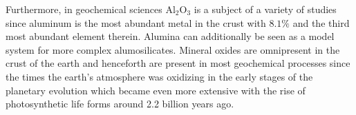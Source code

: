 \documentclass[11pt,DIV=13,BCOR=5mm,a4paper,headinclude]{scrbook}
\begin{document}
Furthermore, in geochemical sciences Al$_2$O$_3$ is a subject of a variety of studies since aluminum is the most abundant metal in the crust with  $8.1\%$ %
and the third most abundant element therein\cite{dtv-Atlas,Riedel}.
Alumina can additionally be seen as a model system for more complex alumosilicates.
Mineral oxides are omnipresent in the crust of the earth and henceforth are present in most geochemical processes since the times the earth's atmosphere was oxidizing in the early stages of the planetary evolution\cite{Trail2011} which became even more extensive with the rise of photosynthetic life forms\cite{Frei2009,Buick2008,Olson2006} around 2.2 billion years ago\cite{Kirschvink2008}.
\\


\end{document}
